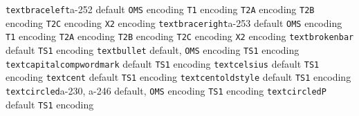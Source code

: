 \documentclass[twoside]{ltxdoc}
\makeatletter
\renewenvironment{theindex}{%
   \@restonecoltrue
   \if@twocolumn\@restonecolfalse\fi
   \columnseprule \z@
   \columnsep 35\p@
   \twocolumn[\index@prologue]%
   \IndexParms
   \let\item\@idxitem
   \ignorespaces
}{\if@restonecol\onecolumn\else\clearpage\fi}
\makeatother
\begin{document}
\begin{theindex}
  \item \texttt  {textbraceleft}\pfill a-252
    \subitem default\pfill {}
    \subitem \texttt  {OMS} encoding\pfill {}
    \subitem \texttt  {T1} encoding\pfill {}
    \subitem \texttt  {T2A} encoding\pfill {}
    \subitem \texttt  {T2B} encoding\pfill {}
    \subitem \texttt  {T2C} encoding\pfill {}
    \subitem \texttt  {X2} encoding\pfill {}
  \item \texttt  {textbraceright}\pfill a-253
    \subitem default\pfill {}
    \subitem \texttt  {OMS} encoding\pfill {}
    \subitem \texttt  {T1} encoding\pfill {}
    \subitem \texttt  {T2A} encoding\pfill {}
    \subitem \texttt  {T2B} encoding\pfill {}
    \subitem \texttt  {T2C} encoding\pfill {}
    \subitem \texttt  {X2} encoding\pfill {}
  \item \texttt  {textbrokenbar}\efill 
    \subitem default\pfill {}
    \subitem \texttt  {TS1} encoding\pfill {}
  \item \texttt  {textbullet}\efill 
    \subitem default\pfill {}, 
    \subitem \texttt  {OMS} encoding\pfill {}
    \subitem \texttt  {TS1} encoding\pfill {}
  \item \texttt  {textcapitalcompwordmark}\efill 
    \subitem default\pfill {}
    \subitem \texttt  {TS1} encoding\pfill {}
  \item \texttt  {textcelsius}\efill 
    \subitem default\pfill {}
    \subitem \texttt  {TS1} encoding\pfill {}
  \item \texttt  {textcent}\efill 
    \subitem default\pfill {}
    \subitem \texttt  {TS1} encoding\pfill {}
  \item \texttt  {textcentoldstyle}\efill 
    \subitem default\pfill {}
    \subitem \texttt  {TS1} encoding\pfill {}
  \item \texttt  {textcircled}\pfill a-230, a-246
    \subitem default\pfill {}, 
    \subitem \texttt  {OMS} encoding\pfill {}
    \subitem \texttt  {TS1} encoding\pfill {}
  \item \texttt  {textcircledP}\efill 
    \subitem default\pfill {}
    \subitem \texttt  {TS1} encoding\pfill {}

\end{theindex}
\end{document}
